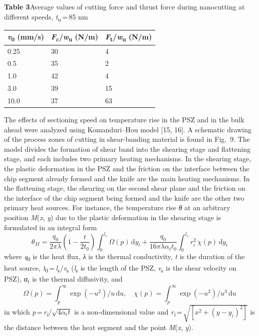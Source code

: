 \documentclass{article}
\begin{document}
\begin{center}
\noindent\textbf{Table 3}\quad Average values of cutting force and thrust force during nanocutting at different speeds, \emph{t}\textsubscript{u}\,=\,85 nm\par\medskip
\begin{tabular}{lll}
\toprule
\emph{v}\textsubscript{0} (mm/s) & \emph{F}\textsubscript{c}/\emph{w}\textsubscript{u} (N/m) & \emph{F}\textsubscript{t}/\emph{w}\textsubscript{u} (N/m) \\
\midrule
0.25 & 30 & 4 \\
0.5 & 35 & 2 \\
1.0 & 42 & 4 \\
3.0 & 39 & 15 \\
10.0 & 37 & 63 \\
\bottomrule
\end{tabular}
\end{center}

The effects of sectioning speed on temperature rise in the PSZ and in the bulk ahead were analyzed using Komanduri–Hou model [15, 16]. A schematic drawing of the process zones of cutting in shear-banding material is found in Fig.~9. The model divides the formation of shear band into the shearing stage and flattening stage, and each includes two primary heating mechanisms. In the shearing stage, the plastic deformation in the PSZ and the friction on the interface between the chip segment already formed and the knife are the main heating mechanisms. In the flattening stage, the shearing on the second shear plane and the friction on the interface of the chip segment being formed and the knife are the other two primary heat sources. For instance, the temperature rise \emph{θ} at an arbitrary position \emph{M}(\emph{x}, \emph{y}) due to the plastic deformation in the shearing stage is formulated in an integral form
\begin{equation*}
\theta_M = \frac{q_0}{2\pi\lambda}\left(1-\frac{t}{2t_0}\right)\int_0^{l_s}\Omega(p)\,\mathrm{d}y_i + \frac{q_0}{16\pi\lambda\alpha_t t_0}\int_0^{l_s} r_i^2\,\chi(p)\,\mathrm{d}y_i \tag{4}
\end{equation*}
where \emph{q}\textsubscript{0} is the heat flux, \emph{λ} is the thermal conductivity, \emph{t} is the duration of the heat source, \emph{t}\textsubscript{0}\,=\,\emph{l}\textsubscript{s}/\emph{v}\textsubscript{s} (\emph{l}\textsubscript{s} is the length of the PSZ, \emph{v}\textsubscript{s} is the shear velocity on PSZ), \emph{α}\textsubscript{t} is the thermal diffusivity, and
\begin{equation*}
\Omega(p) = \int_p^\infty \exp(-u^2)\big/u\,\mathrm{d}u, \quad \chi(p) = \int_p^\infty \exp(-u^2)\big/u^3\,\mathrm{d}u \tag{5}
\end{equation*}
in which \emph{p}\,=\,\emph{r}\textsubscript{\emph{i}}/$\sqrt{4\alpha_\mathrm{t}t}$ is a non-dimensional value and \emph{r}\textsubscript{\emph{i}}\,=\,$\sqrt{[x^2+(y-y_i)^2]}$ is the distance between the heat segment and the point \emph{M}(\emph{x}, \emph{y}).
\end{document}
